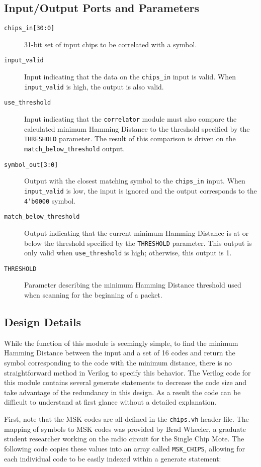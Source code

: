 \subsection{Input/Output Ports and Parameters}
\begin{description}
	\item[\texttt{chips\_in[30:0]}] 31-bit set of input chips to be correlated with a symbol.
	\item[\texttt{input\_valid}] Input indicating that the data on the \texttt{chips\_in} input is valid. When \texttt{input\_valid} is high, the output is also valid.
	\item[\texttt{use\_threshold}] Input indicating that the \texttt{correlator} module must also compare the calculated minimum Hamming Distance to the threshold specified by the \texttt{THRESHOLD} parameter. The result of this comparison is driven on the \texttt{match\_below\_threshold} output.
	\item[\texttt{symbol\_out[3:0]}] Output with the closest matching symbol to the \texttt{chips\_in} input. When \texttt{input\_valid} is low, the input is ignored and the output corresponds to the \texttt{4'b0000} symbol.
	\item[\texttt{match\_below\_threshold}] Output indicating that the current minimum Hamming Distance is at or below the threshold specified by the \texttt{THRESHOLD} parameter. This output is only valid when \texttt{use\_threshold} is high; otherwise, this output is 1.
	\item[\texttt{THRESHOLD}] Parameter describing the minimum Hamming Distance threshold used when scanning for the beginning of a packet.
\end{description}

\subsection{Design Details}
While the function of this module is seemingly simple, to find the minimum Hamming Distance between the input and a set of 16 codes and return the symbol corresponding to the code with the minimum distance, there is no straightforward method in Verilog to specify this behavior. The Verilog code for this module contains several generate statements to decrease the code size and take advantage of the redundancy in this design. As a result the code can be difficult to understand at first glance without a detailed explanation.

First, note that the MSK codes are all defined in the \texttt{chips.vh} header file. The mapping of symbols to MSK codes was provided by Brad Wheeler, a graduate student researcher working on the radio circuit for the Single Chip Mote. The following code copies these values into an array called \texttt{MSK\_CHIPS}, allowing for each individual code to be easily indexed within a generate statement:

